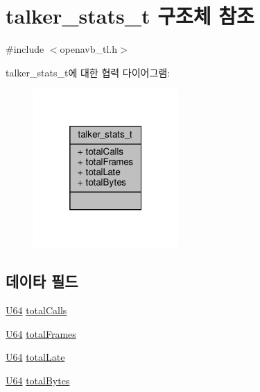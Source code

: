\hypertarget{structtalker__stats__t}{}\section{talker\+\_\+stats\+\_\+t 구조체 참조}
\label{structtalker__stats__t}


{\ttfamily \#include $<$openavb\+\_\+tl.\+h$>$}



talker\+\_\+stats\+\_\+t에 대한 협력 다이어그램\+:
\nopagebreak
\begin{figure}[H]
\begin{center}
\leavevmode
\includegraphics[width=157pt]{structtalker__stats__t__coll__graph}
\end{center}
\end{figure}
\subsection*{데이타 필드}
\begin{DoxyCompactItemize}
\item 
\hyperlink{openavb__types__base__pub_8h_a25809e0734a149248fcf5831efa4e33d}{U64} \hyperlink{structtalker__stats__t_a9e027d04ac91998fac3dbdfe70e93c8f}{total\+Calls}
\item 
\hyperlink{openavb__types__base__pub_8h_a25809e0734a149248fcf5831efa4e33d}{U64} \hyperlink{structtalker__stats__t_a91aa71fc6996d4038afd5252772b8c16}{total\+Frames}
\item 
\hyperlink{openavb__types__base__pub_8h_a25809e0734a149248fcf5831efa4e33d}{U64} \hyperlink{structtalker__stats__t_aba3967ed25ae307754c6341e9e3e51b7}{total\+Late}
\item 
\hyperlink{openavb__types__base__pub_8h_a25809e0734a149248fcf5831efa4e33d}{U64} \hyperlink{structtalker__stats__t_a0c6a9cfc47f701f45a826b03f96f8169}{total\+Bytes}
\end{DoxyCompactItemize}


